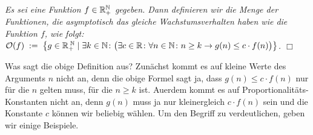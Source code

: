\begin{Definition}[$\Oh(f)$] {\em
  Es sei eine Funktion $f\in {\mathbb R}_+^{\mathbb N}$ 
  gegeben.   Dann definieren wir die Menge der Funktionen, die asymptotisch
  das gleiche Wachstumsverhalten haben wie die Funktion $f$, wie folgt:
  \\[0.1cm]
  \hspace*{1.3cm} 
  $ \mathcal{O}(f) \;:=\; \left\{ g \in {\mathbb R}_+^{\;{\mathbb N}} \mid \exists k \in {\mathbb N} \colon 
    \bigl(\exists c \in {\mathbb R}\colon \forall n \in {\mathbb N} \colon n \geq k \rightarrow g(n) \leq c \cdot f(n)\bigr) \right\}$.
  \hspace*{\fill} $\Box$
}
\end{Definition}
Was sagt die obige Definition aus? Zun\"achst kommt es auf kleine Werte des Arguments $n$
nicht an, denn die obige Formel sagt ja, dass $g(n) \leq c \cdot f(n)$ nur f\"ur die $n$ gelten
muss, f\"ur die  $n \geq k$ ist.  Au\3erdem kommt es auf Proportionalit\"ats-Konstanten nicht
an, denn $g(n)$ muss ja nur kleinergleich $c \cdot f(n)$ sein und die Konstante $c$ k\"onnen wir
beliebig w\"ahlen.  Um den Begriff zu verdeutlichen, geben wir einige Beispiele.
\vspace*{0.3cm}

